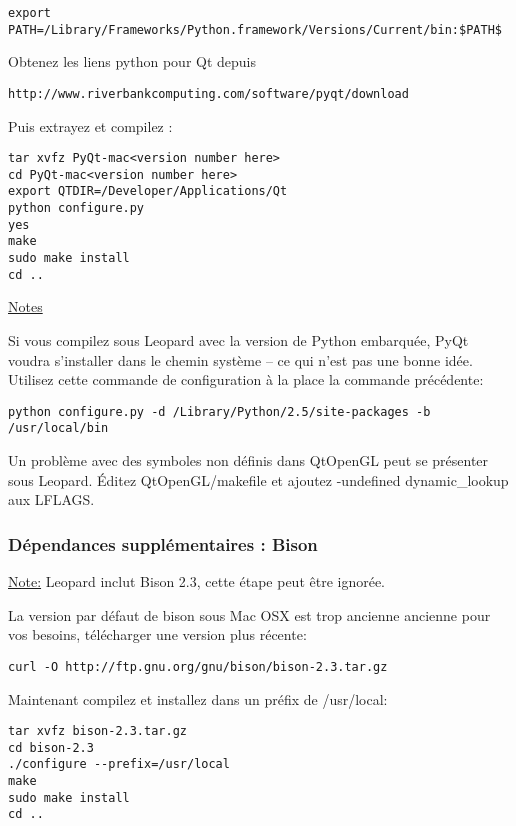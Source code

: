 \begin{verbatim}
export PATH=/Library/Frameworks/Python.framework/Versions/Current/bin:$PATH$
\end{verbatim}

Obtenez les liens python pour Qt depuis

\begin{verbatim}
http://www.riverbankcomputing.com/software/pyqt/download
\end{verbatim}

Puis extrayez et compilez :

\begin{verbatim}
tar xvfz PyQt-mac<version number here>
cd PyQt-mac<version number here>
export QTDIR=/Developer/Applications/Qt
python configure.py 
yes 
make 
sudo make install 
cd ..  
\end{verbatim}

\underline{Notes}

Si vous compilez sous Leopard avec la version de Python embarqu\'ee, PyQt voudra s'installer dans le chemin syst\`eme -- ce qui n'est pas une bonne id\'ee. Utilisez cette commande de configuration \`a la place la commande pr\'ec\'edente:

\begin{verbatim}
python configure.py -d /Library/Python/2.5/site-packages -b /usr/local/bin
\end{verbatim}

Un probl\`eme avec des symboles non d\'efinis dans QtOpenGL peut se pr\'esenter sous Leopard.  \'Editez
QtOpenGL/makefile et ajoutez -undefined dynamic\_lookup aux LFLAGS.

\subsubsection{D\'ependances suppl\'ementaires : Bison}
\underline{Note:} Leopard inclut Bison 2.3, cette \'etape peut \^etre ignor\'ee.

La version par d\'efaut de bison sous Mac OSX est trop ancienne ancienne pour vos besoins, t\'el\'echarger une version plus r\'ecente:

\begin{verbatim}
curl -O http://ftp.gnu.org/gnu/bison/bison-2.3.tar.gz 
\end{verbatim}

Maintenant compilez et installez dans un pr\'efix de /usr/local:

\begin{verbatim}
tar xvfz bison-2.3.tar.gz 
cd bison-2.3 
./configure --prefix=/usr/local 
make
sudo make install 
cd ..  
\end{verbatim}

